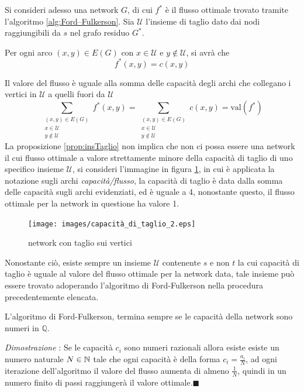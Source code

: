 \documentclass[10pt, letterpaper]{report}
\begin{document}
Si consideri adesso una network $G$, di cui $f^*$ è il flusso ottimale trovato tramite l'algoritmo \ref{alg:Ford–Fulkerson}. Sia $\mathcal U$ l'insieme di taglio dato dai nodi raggiungibili da $s$ nel grafo residuo $G^*$.
\begin{osservazione}
    Per ogni arco $(x,y)\in E(G)$ con $x\in \mathcal U$ e $y\notin \mathcal U$, si avrà che $$ f^*(x,y)=c(x,y)$$
\end{osservazione}
Il valore del flusso è uguale alla somma delle capacità degli archi che collegano i vertici in $\mathcal U$ a quelli fuori da $\mathcal U$
$$ \sum_{\begin{matrix}
    (x,y)\in E(G)\\ x\in \mathcal U\\ y\notin \mathcal U
\end{matrix}}f^*(x,y)=\sum_{\begin{matrix}
    (x,y)\in E(G)\\ x\in \mathcal U\\ y\notin \mathcal U
\end{matrix}}c(x,y)=\text{val}(f^*)$$
La proposizione \ref{prop:insTaglio} non implica che non ci possa essere una network il cui flusso ottimale a valore strettamente minore della capacità di taglio di uno specifico insieme $\mathcal U$, si consideri l'immagine in figura \ref{taglio2}, in cui è applicata la notazione sugli archi \textit{capacità/flusso}, la capacità di taglio è data dalla somma delle capacità sugli archi evidenziati, ed è uguale a 4, nonostante questo, il flusso ottimale per la network in questione ha valore 1.
\begin{figure}[h!]
    \centering 
    \texttt{[image: images/capacità\_di\_taglio\_2.eps]}
    \caption{network con taglio sui vertici}
    \label{taglio2}
\end{figure}

Nonostante ciò, esiste sempre un insieme $\mathcal U$ contenente $s$ e non $t$ la cui capacità di taglio è uguale al valore del flusso ottimale per la network data, tale insieme può essere trovato adoperando l'algoritmo di Ford-Fulkerson nella procedura precedentemente elencata.
\begin{osservazione}
    L'algoritmo di Ford-Fulkerson, termina sempre se le capacità della network sono numeri in $\mathbb Q$.
\end{osservazione}
\textit{Dimostrazione} : Se le capacità $c_i$ sono numeri razionali allora esiste esiste un numero naturale $N\in{\mathbb N}$ tale che ogni capacità è della forma $c_i=\frac{a_i}{N}$, ad ogni iterazione dell'algoritmo il valore del flusso aumenta di almeno $\frac{1}{N}$, quindi in un numero finito di passi raggiungerà il valore ottimale.\hfill$\blacksquare$
\end{document}

